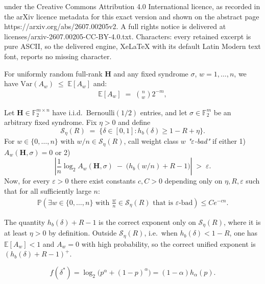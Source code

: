 \documentclass[10pt,a4paper]{amsart}
\newcommand{\Eb}{\mathbb{E}}
\newcommand{\Fb}{\mathbb{F}}
\newcommand{\Hb}{h_b}
\newcommand{\Hm}{\mathbf{H}}
\newcommand{\Pb}{\mathbb{P}}
\newcommand{\Seta}{\mathcal{S}}
\newcommand{\eps}{\varepsilon}
\begin{document}
under the Creative Commons Attribution 4.0 International licence, as recorded in the arXiv licence metadata for this exact version and shown on the abstract page https://arxiv.org/abs/2607.00205v2. A full rights notice is delivered at licenses/arxiv-2607.00205-CC-BY-4.0.txt. Characters: every retained excerpt is pure ASCII, so the delivered engine, XeLaTeX with its default Latin Modern text font, reports no missing character.
\begin{lemma}
\label{lem:Aw_moments}
For uniformly random full-rank $\Hm$ and any fixed syndrome $\sigma$, \( w=1,\ldots,n\), we have \(\mathrm{Var}(A_w) \;\le\; \Eb[A_w]\) and:
\begin{align}
    \Eb[A_w] \;=\; \binom{n}{w}2^{-m}, \label{eq:Aw_mean}
\end{align}
\end{lemma}

\begin{theorem}
\label{thm:spectrum}
Let $\Hm \in\Fb_2^{m\times n}$ have i.i.d.\ $\mathrm{Bernoulli}(1/2)$
entries, and let $\sigma\in\Fb_2^m$ be an arbitrary fixed syndrome.
Fix $\eta>0$ and define
\[
    \Seta_\eta(R)
    \;=\;
    \{\delta\in[0,1]:\Hb(\delta)\ge 1-R+\eta\}.
\]
For $w\in\{0,\ldots,n\}$ with $w/n\in\Seta_\eta(R)$, call weight
class $w$ \emph{"$\varepsilon$-bad"} if either 1) $A_w(\Hm,\sigma)=0$ or 2)
\[
    \left|\frac{1}{n}\log_2 A_w(\Hm,\sigma)
    \;-\;\bigl(\Hb(w/n)+R-1\bigr)\right|
    \;>\;\varepsilon.
\]
Now, for every $\eps>0$ there exist constants $c,C>0$
depending only on $\eta,R,\eps$ such that for all sufficiently large $n$:
\begin{align}
    \Pb\!\left(
    \exists w\in\{0,\ldots,n\}
    \text{ with }
    \tfrac{w}{n}\in\Seta_\eta(R)
    \text{ that is $\varepsilon$-bad}
    \right)
    \le
    Ce^{-cn}.
    \label{eq:spectrum_conc}
\end{align}

The quantity $\Hb(\delta)+R-1$ is the correct exponent only
on $\Seta_\eta(R)$, where it is at least $\eta>0$ by definition.
Outside $\Seta_\eta(R)$, i.e.\ when $\Hb(\delta)<1-R$,
one has $\Eb[A_w]<1$ and $A_w=0$ with high probability,
so the correct unified exponent is $(\Hb(\delta)+R-1)^+$.

\end{theorem}

\begin{lemma}
\label{lem:f_max}
\[
\displaystyle f(\delta^*)
=\log_2\!\bigl(p^\alpha+(1-p)^\alpha\bigr)
=(1-\alpha)h_\alpha(p).\]
\end{lemma}
\end{document}
